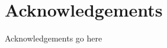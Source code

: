 \cleardoublepage{}
\newpage
\chapter*{Acknowledgements}
\label{Acknowledgements}

\pagestyle{empty}
\fancyhead[RE]{}
\fancyhead[LO]{}

Acknowledgements go here
